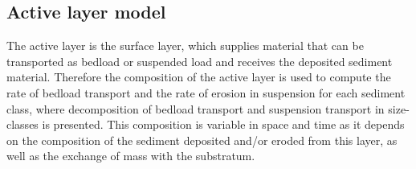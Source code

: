 
\subsection{Active layer model}\label{bedmodel:active}
The active layer is the surface layer, which supplies material that can be transported as bedload or suspended load and receives the deposited sediment material. Therefore the composition of the active layer is used to compute the rate of bedload transport and the rate of erosion in suspension for each sediment class, where decomposition of bedload transport and suspension transport in size-classes is presented. This composition is variable in space and time as it depends on the composition of the sediment deposited and/or eroded from this layer, as well as the exchange of mass with the substratum.

